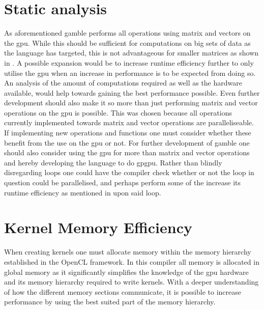 \section{Static analysis}
As aforementioned \gls{gamble} performs all operations using matrix and vectors on the \acrshort{gpu}.
While this should be sufficient for computations on big sets of data as the language has targeted, this is not advantageous for smaller matrices as shown in .
A possible expansion would be to increase runtime efficiency further to only utilise the \acrshort{gpu} when an increase in performance is to be expected from doing so. 
An analysis of the amount of computations required as well as the hardware available, would help towards gaining the best performance possible.
Even further development should also make it so more than just performing matrix and vector operations on the \acrshort{gpu} is possible.
This was chosen because all operations currently implemented towards matrix and vector operations are paralleliseable.
If implementing new operations and functions one must consider whether these benefit from the use on the \acrshort{gpu} or not.
For further development of \gls{gamble} one should also consider using the \acrshort{gpu} for more than matrix and vector operations and hereby developing the language to do \gls{gpgpu}. 
Rather than blindly disregarding loops one could have the compiler check whether or not the loop in question could be parallelised, and perhaps perform some of the increase its runtime efficiency as mentioned in  upon said loop.
 
\section{Kernel Memory Efficiency}
When creating kernels one must allocate memory within the memory hierarchy established in the OpenCL framework. 
In this compiler all memory is allocated in global memory as it significantly simplifies the knowledge of the \acrshort{gpu} hardware and its memory hierarchy required to write kernels.
With a deeper understanding of how the different memory sections communicate, it is possible to increase performance by using the best suited part of the memory hierarchy. \citep{ocl_lecture3} 

